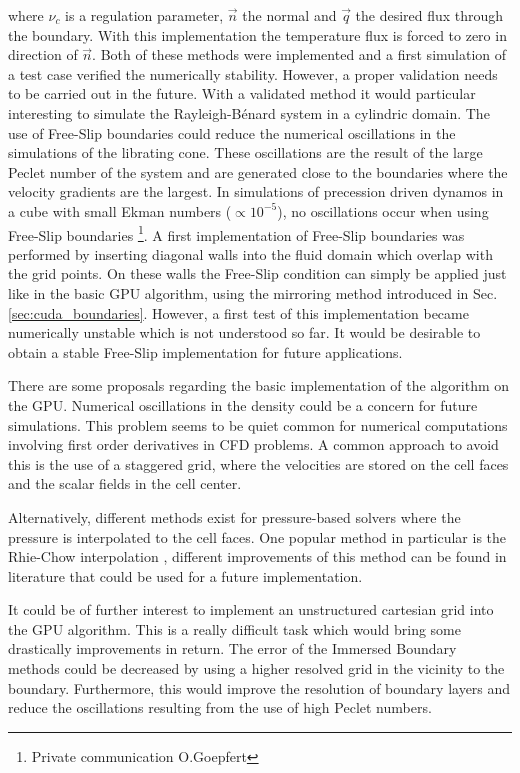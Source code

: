 where $\nu_c$ is a regulation parameter, $\vec{n}$ the normal and $\vec{q}$  the desired flux through the boundary.
With this implementation the temperature flux is forced to zero in direction of $\vec{n}$.
Both of these methods were implemented and a first simulation of a test case verified the numerically stability.
However, a proper validation needs to be carried out in the future.
With a validated method it would  particular interesting to simulate
the Rayleigh-B\'{e}nard system in a cylindric domain.
\clearpage
The use of Free-Slip boundaries could reduce the numerical oscillations in the simulations of the librating cone.
These oscillations are the result of the large Peclet number of the system and are generated
close to the boundaries where the velocity gradients are the largest.
In simulations of precession driven dynamos in a cube with small Ekman numbers ($\propto 10^{-5}$),
no oscillations occur when using Free-Slip boundaries \footnote{Private communication O.Goepfert}.
A first implementation of Free-Slip boundaries was performed
by inserting diagonal walls into the fluid domain which overlap with the grid points.
On these walls the Free-Slip condition can simply be applied just like in the basic GPU algorithm,
using the mirroring method introduced in Sec. \ref{sec:cuda_boundaries}.
However, a first test of this implementation became numerically unstable which is not understood so far.
It would be desirable to obtain a stable Free-Slip implementation for future applications.

There are some proposals regarding the basic implementation of the algorithm on the GPU.
Numerical oscillations in the density could be a concern for future simulations.
This problem seems to be quiet common for numerical computations involving first order derivatives in CFD problems.
A common approach to avoid this is the use of a staggered grid, where the velocities
are stored on the cell faces and the scalar fields in the cell center.

Alternatively, different methods exist for pressure-based solvers where the pressure is interpolated to the cell faces.
One popular method in particular is the Rhie-Chow interpolation \citep{Rhie1983},
different improvements of this method can be found in literature that could be used for a future implementation.

It could be of further interest to implement an unstructured cartesian grid into the GPU algorithm.
This is a really difficult task which would bring some drastically improvements in return.
The error of the Immersed Boundary methods could be decreased by using a higher resolved grid in the vicinity to the boundary.
Furthermore, this would improve the resolution of boundary layers  and reduce the oscillations resulting from the use of high Peclet numbers.


